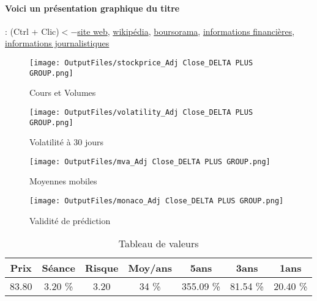 \documentclass[11pt,a4paper]{report}%
\begin{document}
\paragraph{Voici un présentation graphique du titre} : (Ctrl + Clic)$<-$\href{https://www.deltaplusgroup.com/fr/web/delta-plus-group/actualites-financieres-informations-reglementees}{site web}, \href{https://fr.wikipedia.org/wiki/Delta_Plus_Group}{wikipédia}, \href{https://www.boursorama.com/cours/1rPDLTA}{boursorama}, \href{https://www.qwant.com/?q=site:https:%2f%2fwww.easybourse.com%2faction-societe%2fDELTA-PLUS-GROUP&t=web&client=ext-firefox-hp}{informations financières}, \href{https://bourse.lerevenu.com/cours-de-bourse/fiche-valeur-synthese/DELTA-PLUS-GROUP/DLTA-FR}{informations journalistiques}
\begin{figure}[!htb]
   \begin{minipage}{0.5\textwidth}
     \centering
     \texttt{[image: OutputFiles/stockprice\_Adj Close\_DELTA PLUS GROUP.png]}
     \caption{Cours et Volumes}\label{Fig:price_DELTA PLUS GROUP}
   \end{minipage}\hfill
   \begin{minipage}{0.5\textwidth}
     \centering
     \texttt{[image: OutputFiles/volatility\_Adj Close\_DELTA PLUS GROUP.png]}
     \caption{Volatilité à 30 jours}\label{Fig:volat_DELTA PLUS GROUP}
   \end{minipage}
\end{figure}
\begin{figure}[!htb]
   \begin{minipage}{0.5\textwidth}
     \centering
     \texttt{[image: OutputFiles/mva\_Adj Close\_DELTA PLUS GROUP.png]}
     \caption{Moyennes mobiles}\label{Fig:mva_DELTA PLUS GROUP}
   \end{minipage}\hfill
   \begin{minipage}{0.5\textwidth}
     \centering
     \texttt{[image: OutputFiles/monaco\_Adj Close\_DELTA PLUS GROUP.png]}
     \caption{Validité de prédiction}\label{Fig:prediction_DELTA PLUS GROUP}
   \end{minipage}
\end{figure}

\begin{table}[H]
  \centering
    \begin{tabular}{|c|c|c|c|c|c|c|}
    \hline
    Prix & Séance & Risque  & Moy/ans & 5ans & 3ans & 1ans \\
    \hline
    83.80 &    3.20 \%    & 3.20 & 34 \% & 355.09 \% & 81.54 \% & 20.40 \% \\
    \hline
    \end{tabular}%
        \label{tab:table_DELTA PLUS GROUP}%
      \caption{Tableau de valeurs}
\end{table}%
\end{document}
